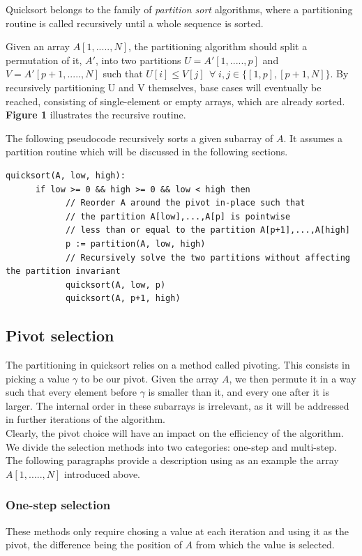 \documentclass[]{finalproject}
\begin{document}
Quicksort belongs to the family of \textit{partition sort} algorithms,
where a partitioning routine is called recursively until a whole sequence is sorted.

Given an array $A[1,.....,N]$, the partitioning algorithm should split a permutation
of it, $A'$, into two partitions $U=A'[1,.....,p]$ and $V=A'[p+1,.....,N]$ such that
$U[i] \leq V[j] \;\, \forall \; i,j \in \{[1,p] , [p+1,N]\}$. 
By recursively partitioning U and V themselves, base cases will eventually be reached,
consisting of single-element or empty arrays, which are already sorted.
\textbf{Figure 1} illustrates the recursive routine.

The following pseudocode recursively sorts a given subarray of $A$. It assumes a partition routine which will be discussed in the following sections.

\begin{verbatim}
quicksort(A, low, high):
      if low >= 0 && high >= 0 && low < high then
            // Reorder A around the pivot in-place such that
            // the partition A[low],...,A[p] is pointwise
            // less than or equal to the partition A[p+1],...,A[high]
            p := partition(A, low, high)
            // Recursively solve the two partitions without affecting the partition invariant
            quicksort(A, low, p)
            quicksort(A, p+1, high)
\end{verbatim}

\subsection{Pivot selection}
The partitioning in quicksort relies on a method called pivoting. This consists in picking a value $\gamma$ to be our pivot. Given the array $A$, we then permute it in a way such that every element before $\gamma$ is smaller than it, and every one after it is larger. The internal order in these subarrays is irrelevant, as it will be addressed in further iterations of the algorithm.\\
Clearly, the pivot choice will have an impact on the efficiency of the algorithm. We divide the selection methods into two categories: one-step and multi-step.\\
The following paragraphs provide a description using as an example the array $A[1,.....,N]$ introduced above.

\subsubsection{One-step selection}
These methods only require chosing a value at each iteration and using it as the pivot, the difference being the position of $A$ from which the value is selected.
\end{document}
